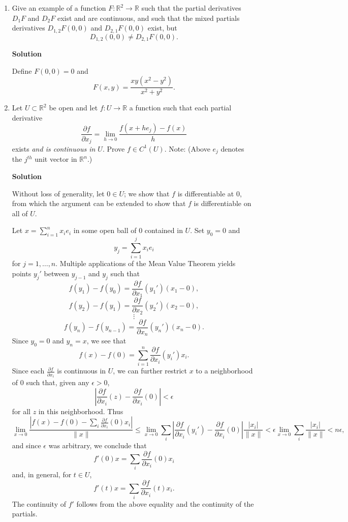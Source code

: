 \documentclass{article}
\begin{document}
\begin{enumerate}
\item Give an example of a function \(F : \mathbb{R}^2 \to \mathbb{R}\) such that the partial derivatives \(D_1F\) and \(D_2F\) exist and are continuous, and such that the mixed partials derivatives \(D_{1,2}F(0,0)\) and \(D_{2,1}F(0,0)\) exist, but
\[D_{1,2}(0,0) \neq D_{2,1}F(0,0).\]

{\bf Solution}

Define \(F(0,0) = 0\) and
\[F(x,y) = \frac{xy(x^2 - y^2)}{x^2 + y^2}.\]



\item Let \(U \subset \mathbb{R}^2\) be open and let \(f : U \to \mathbb{R}\) a function such that each partial derivative
\[\frac{\partial f}{\partial x_j} = \lim_{h \to 0} \frac{f(x + he_j) - f(x)}{h}\]
exists {\em and is continuous in \(U\)}.  Prove \(f \in C^1(U)\).  Note:  (Above \(e_j\) denotes the \(j^{th}\) unit vector in \(\mathbb{R}^n\).)

{\bf Solution}

Without loss of generality, let \(0 \in U\); we show that \(f\) is differentiable at \(0\), from which the argument can be extended to show that \(f\) is differentiable on all of \(U\).

Let \(x = \sum_{i = 1}^n x_i e_i\) in some open ball of \(0\) contained in \(U\).  Set \(y_0 = 0\) and
\[y_j = \sum_{i = 1}^j x_i e_i\]
for \(j = 1, \ldots, n\).  Multiple applications of the Mean Value Theorem yields points \(y_j'\) between \(y_{j - 1}\) and \(y_j\) such that
\[f(y_1) - f(y_0) = \frac{\partial f}{\partial x_1}(y_1')(x_1 - 0),\]
\[f(y_2) - f(y_1) = \frac{\partial f}{\partial x_2}(y_2')(x_2 - 0),\]
\[\vdots\]
\[f(y_n) - f(y_{n - 1}) = \frac{\partial f}{\partial x_n}(y_n')(x_n - 0).\]
Since \(y_0 = 0\) and \(y_n = x\), we see that
\[f(x) - f(0) = \sum_{i = 1}^n \frac{\partial f}{\partial x_i}(y_i')x_i.\]
Since each \(\frac{\partial f}{\partial x_i}\) is continuous in \(U\), we can further restrict \(x\) to a neighborhood of \(0\) such that, given any \(\epsilon > 0\),
\[\left| \frac{\partial f}{\partial x_i}(z) - \frac{\partial f}{\partial x_i}(0) \right| < \epsilon\]
for all \(z\) in this neighborhood.  Thus
\[\lim_{x \to 0} \frac{\left| f(x) - f(0) - \sum_i \frac{\partial f}{\partial x_i}(0) x_i \right|}{\|x\|}
  \leq \lim_{x \to 0} \sum_i \left| \frac{\partial f}{\partial x_i}(y_i') - \frac{\partial f}{\partial x_i}(0) \right| \frac{|x_i|}{\|x\|}
     < \epsilon \lim_{x \to 0} \sum_i \frac{|x_i|}{\|x\|}
     < n\epsilon,\]
and since \(\epsilon\) was arbitrary, we conclude that
\[f'(0)x = \sum_i \frac{\partial f}{\partial x_i}(0) x_i\]
and, in general, for \(t \in U\),
\[f'(t)x = \sum_i \frac{\partial f}{\partial x_i}(t) x_i.\]
The continuity of \(f'\) follows from the above equality and the continuity of the partials.




\end{enumerate}
\end{document}
